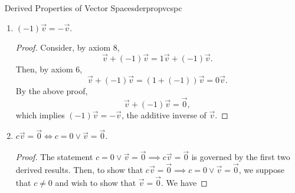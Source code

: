\begin{theorem}{\Stop\,\,Derived Properties of Vector Spaces}{derpropvcspc}
\begin{enumerate}
\begin{proof}
                    Consider, by axiom \(3\),
                    \begin{equation*}
                        0\vec{v}=0\vec{v}+\vec{0}.
                    \end{equation*}
                    Then, by axiom \(4\), we have
                    \begin{equation*}
                        0\vec{v}=0\vec{v}+0\vec{v}+(-0\vec{v}).
                    \end{equation*}
                    By axiom \(6\),
                    \begin{equation*}
                        0\vec{v}=(0+0)\vec{v}+(-0\vec{v})=0\vec{v}+(-0\vec{v}).
                    \end{equation*}
                    Finally, by axiom \(4\), 
                    \begin{equation*}
                        0\vec{v}=\vec{0}
                    \end{equation*}
                    and we have proved the proposition.
                \end{proof}
                \pagebreak
                \item \((-1)\vec{v}=-\vec{v}\).
                \begin{proof}
                    Consider, by axiom \(8\),
                    \begin{equation*}
                        \vec{v}+(-1)\vec{v}=1\vec{v}+(-1)\vec{v}.
                    \end{equation*}
                    Then, by axiom \(6\),
                    \begin{equation*}
                        \vec{v}+(-1)\vec{v}=(1+(-1))\vec{v}=0\vec{v}.
                    \end{equation*}
                    By the above proof, 
                    \begin{equation*}
                        \vec{v}+(-1)\vec{v}=\vec{0},
                    \end{equation*}
                    which implies \((-1)\vec{v}=-\vec{v}\), the additive inverse of \(\vec{v}\).
                \end{proof}
                \item \(c\vec{v}=\vec{0}\iff c=0\vee \vec{v}=\vec{0}\).
                \begin{proof}
                    The statement \(c=0\vee\vec{v}=\vec{0}\implies c\vec{v}=\vec{0}\) is governed by the first two derived results. Then, to show that \(c\vec{v}=\vec{0}\implies c=0\vee\vec{v}=\vec{0}\), we suppose that \(c\neq0\) and wish to show that \(\vec{v}=\vec{0}\). We have

\end{proof}
\end{enumerate}
\end{theorem}
